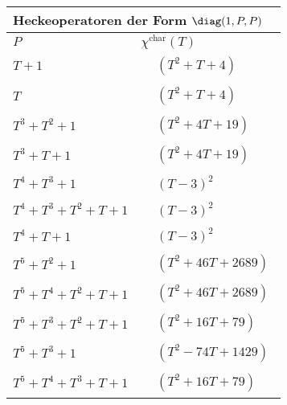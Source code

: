 \begin{tabular}{| l | l |}
\multicolumn{2}{l}{\bf Heckeoperatoren der Form $\diag(1,P,P)$} \\
\hline
$P$ & $\chi^\text{char}(T)$ \\
\hline
$T + 1$ &
$\!\begin{aligned}
	&(T^{2} + T + 4)\end{aligned}$ \\
\hline
$T$ &
$\!\begin{aligned}
	&(T^{2} + T + 4)\end{aligned}$ \\
\hline
$T^3 + T^2 + 1$ &
$\!\begin{aligned}
	&(T^{2} + 4T + 19)\end{aligned}$ \\
\hline
$T^3 + T + 1$ &
$\!\begin{aligned}
	&(T^{2} + 4T + 19)\end{aligned}$ \\
\hline
$T^4 + T^3 + 1$ &
$\!\begin{aligned}
	&(T - 3)^{2}\end{aligned}$ \\
\hline
$T^4 + T^3 + T^2 + T + 1$ &
$\!\begin{aligned}
	&(T - 3)^{2}\end{aligned}$ \\
\hline
$T^4 + T + 1$ &
$\!\begin{aligned}
	&(T - 3)^{2}\end{aligned}$ \\
\hline
$T^5 + T^2 + 1$ &
$\!\begin{aligned}
	&(T^{2} + 46T + 2689)\end{aligned}$ \\
\hline
$T^5 + T^4 + T^2 + T + 1$ &
$\!\begin{aligned}
	&(T^{2} + 46T + 2689)\end{aligned}$ \\
\hline
$T^5 + T^3 + T^2 + T + 1$ &
$\!\begin{aligned}
	&(T^{2} + 16T + 79)\end{aligned}$ \\
\hline
$T^5 + T^3 + 1$ &
$\!\begin{aligned}
	&(T^{2} - 74T + 1429)\end{aligned}$ \\
\hline
$T^5 + T^4 + T^3 + T + 1$ &
$\!\begin{aligned}
	&(T^{2} + 16T + 79)\end{aligned}$ \\

\end{tabular}
